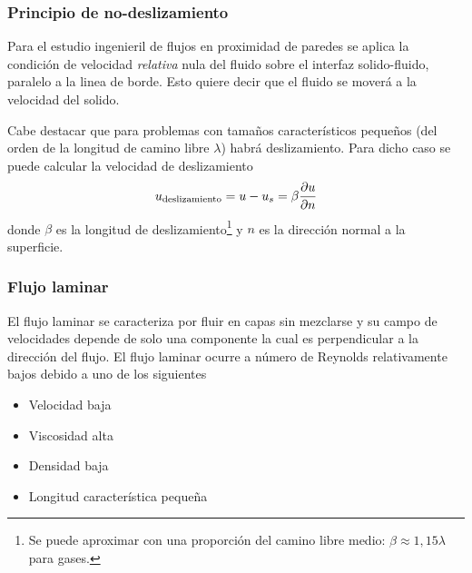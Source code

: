 \subsubsection{Principio de no-deslizamiento}
Para el estudio ingenieril de flujos en proximidad de paredes se aplica la condición de velocidad \textit{relativa} nula del fluido sobre el interfaz solido-fluido, paralelo a la linea de borde. Esto quiere decir que el fluido se moverá a la velocidad del solido.

Cabe destacar que para problemas con tamaños característicos pequeños (del orden de la longitud de camino libre $\lambda$) habrá deslizamiento. Para dicho caso se puede calcular la velocidad de deslizamiento
\[
u_{\textrm{deslizamiento}}=u-u_s=\beta \frac{\partial u}{\partial n}
\]
donde $\beta$ es la longitud de deslizamiento\footnote{Se puede aproximar con una proporción del camino libre medio: $\beta\approx 1,15\lambda$ para gases.} y $n$ es la dirección normal a la superficie.

\subsubsection{Flujo laminar}
El flujo laminar se caracteriza por fluir en capas sin mezclarse y su campo de velocidades depende de solo una componente la cual es perpendicular a la dirección del flujo. El flujo laminar ocurre a número de Reynolds relativamente bajos debido a uno de los siguientes
\begin{itemize}
    \item Velocidad baja
    \item Viscosidad alta
    \item Densidad baja
    \item Longitud característica pequeña
\end{itemize}

